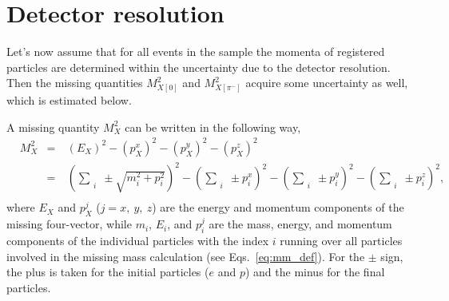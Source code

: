 \section{Detector resolution}
\mbox{}\vspace{-\baselineskip}


Let's now assume that for all events in the sample the momenta of registered particles are determined within the uncertainty due to the detector resolution. Then the missing quantities $M_{X[0]}^{2}$ and $M_{X[\pi^{-}]}^{2}$ acquire some uncertainty as well, which is estimated below.


A missing quantity $M_{X}^{2}$ can be written in the following way,
\begin{equation}
\begin{aligned}
&M_{X}^{2}&=&~(E_{X})^{2} - (p_{X}^{x})^{2} - (p_{X}^{y})^{2}  -  (p_{X}^{z})^{2} \\
&&=&~\left (\sum_{\substack{i}} \pm \sqrt{m_{i}^{2}+p_{i}^{2}} \right )^{2} - \left (\sum_{\substack{i}}\pm p_{i}^{x} \right )^{2} - \left (\sum_{\substack{i}}\pm p_{i}^{y} \right )^{2} - \left (\sum_{\substack{i}}\pm p_{i}^{z} \right )^{2},\\
\end{aligned}\label{eq:mm_def2}
\end{equation}
where $E_{X}$ and $p_{X}^{j}$ ($j = x,~y,~z$) are the energy and momentum components of the missing four-vector, while $m_{i}$, $E_{i}$, and $p_{i}^{j}$ are the mass, energy, and momentum components of the individual particles with the index $i$ running over all particles involved in the missing mass calculation (see Eqs.~\eqref{eq:mm_def}). For the $\pm$ sign, the plus is taken for the initial particles ($e$ and $p$) and the minus for the final particles.



